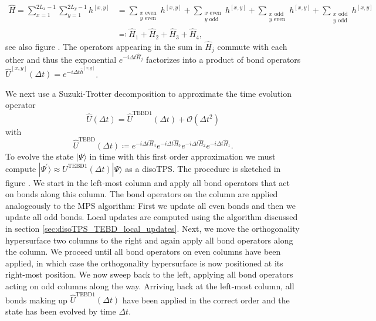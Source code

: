 \begin{equation}
	\label{eq:disoTPS_TEBD_splitting_local_Hamiltonian}
	\begin{split}
		\hat{H} = \sum_{x=1}^{2L_x-1} \sum_{y=1}^{2L_y-1}h^{[x,y]} &= \sum_{\substack{x\text{ even}\\y\text{ even}}} h^{[x, y]} + \sum_{\substack{x\text{ even}\\y\text{ odd}}} h^{[x, y]} + \sum_{\substack{x\text{ odd}\\y\text{ even}}} h^{[x, y]} + \sum_{\substack{x\text{ odd}\\y\text{ odd}}} h^{[x, y]} \\
		&\eqqcolon \hat{H}_1 + \hat{H}_2 + \hat{H}_3 + \hat{H}_4,
	\end{split}
\end{equation}
see also figure . The operators appearing in the sum in $\hat{H}_j$ commute with each other and thus the exponential $e^{-i\Delta t\hat{H}_j}$ factorizes into a product of bond operators $\hat{U}^{[x, y]}(\Delta t) = e^{-i\Delta t\hat{h}^{[x, y]}}$. \par
We next use a Suzuki-Trotter decomposition to approximate the time evolution operator
\begin{equation}
	\label{eq:disoTPS_TEBD_suzuki_trotter_first_order}
	\hat{U}(\Delta t) = \hat{U}^\text{TEBD1}(\Delta t) + \mathcal{O}(\Delta t^2)
\end{equation}
with
\begin{equation}
	\label{eq:disoTPS_TEBD_first_order_TEBD_operator}
	\hat{U}^\text{TEBD}(\Delta t) \coloneqq e^{-i\Delta t\hat{H}_4} e^{-i\Delta t\hat{H}_3} e^{-i\Delta t\hat{H}_2} e^{-i\Delta t\hat{H}_1}.
\end{equation}
To evolve the state $|\Psi\rangle$ in time with this first order approximation we must compute $|\Psi^\prime\rangle \approx U^\text{TEBD1}(\Delta t)|\Psi\rangle$ as a disoTPS. The procedure is sketched in figure . We start in the left-most column and apply all bond operators that act on bonds along this column. The bond operators on the column are applied analogeously to the MPS algorithm: First we update all even bonds and then we update all odd bonds. Local updates are computed using the algorithm discussed in section \ref{sec:disoTPS_TEBD_local_updates}. Next, we move the orthogonality hypersurface two columns to the right and again apply all bond operators along the column. We proceed until all bond operators on even columns have been applied, in which case the orthogonality hypersurface is now positioned at its right-most position. We now sweep back to the left, applying all bond operators acting on odd columns along the way. Arriving back at the left-most column, all bonds making up $\hat{U}^\text{TEBD1}(\Delta t)$ have been applied in the correct order and the state has been evolved by time $\Delta t$. \par
